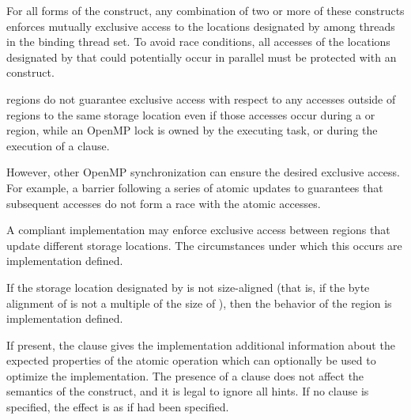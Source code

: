 For all forms of the  construct, any combination of two or more
of these  constructs enforces mutually exclusive access to the
locations designated by  among threads in the binding thread set.  To
avoid race conditions, all accesses of the locations designated by 
that could potentially occur in parallel must be protected with an
 construct. 

 regions do not guarantee exclusive access with respect to any accesses outside 
of  regions to the same storage location  even if those accesses occur during a 
 or  region, while an OpenMP lock is owned by the executing 
task, or during the execution of a  clause.

However, other OpenMP synchronization can ensure the desired exclusive access. For 
example, a barrier following a series of atomic updates to  guarantees that subsequent 
accesses do not form a race with the atomic accesses. 

A compliant implementation may enforce exclusive access between  regions 
that update different storage locations. The circumstances under which this occurs are 
implementation defined. 

If the storage location designated by  is not size-aligned (that is, if the byte alignment 
of  is not a multiple of the size of ), then the behavior of the  region is 
implementation defined.

If present, the \code{)} clause gives the implementation additional
information about the expected properties of the atomic operation
which can optionally be used to optimize the implementation. 
The presence of a  clause does not affect the semantics of
the  construct, and it is legal to ignore all hints.
If no  clause is specified, the effect is as if  had been specified.

